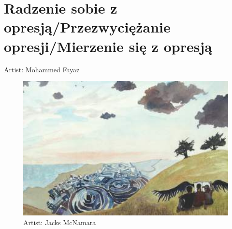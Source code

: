 \chapter{Radzenie sobie z opresją/Przezwyciężanie opresji/Mierzenie się z opresją}
Artist: Mohammed Fayaz
\newpagek

\begin{figure}[h]
\centering
\includegraphics[width=16cm]{TeX_files/3-1.png}
\caption{Artist: Jacks McNamara}
\label{3-1}
\end{figure}

